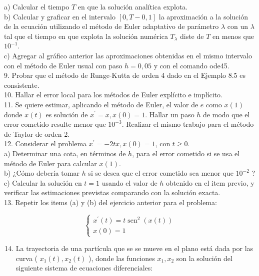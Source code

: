 \documentclass[10pt]{article}
\begin{document}
a) Calcular el tiempo $T$ en que la solución analítica explota.\\
b) Calcular y graficar en el intervalo $[0, T-0,1]$ la aproximación a la solución de la ecuación utilizando el método de Euler adaptativo de parámetro $\lambda$ con un $\lambda$ tal que el tiempo en que explota la solución numérica $T_{\lambda}$ diste de $T$ en menos que $10^{-1}$.\\
c) Agregar al gráfico anterior las aproximaciones obtenidas en el mismo intervalo con el método de Euler usual con paso $h=0,05$ y con el comando ode45.\\
9. Probar que el método de Runge-Kutta de orden 4 dado en el Ejemplo 8.5 es consistente.\\
10. Hallar el error local para los métodos de Euler explícito e implícito.\\
11. Se quiere estimar, aplicando el método de Euler, el valor de $e$ como $x(1)$ donde $x(t)$ es solución de $x^{\prime}=x, x(0)=1$. Hallar un paso $h$ de modo que el error cometido resulte menor que $10^{-3}$. Realizar el mismo trabajo para el método de Taylor de orden 2.\\
12. Considerar el problema $x^{\prime}=-2 t x, x(0)=1$, con $t \geq 0$.\\
a) Determinar una cota, en términos de $h$, para el error cometido si se usa el método de Euler para calcular $x(1)$.\\
b) ¿Cómo debería tomar $h$ si se desea que el error cometido sea menor que $10^{-2}$ ?\\
c) Calcular la solución en $t=1$ usando el valor de $h$ obtenido en el item previo, y verificar las estimaciones previstas comparando con la solución exacta.\\
13. Repetir los items (a) y (b) del ejercicio anterior para el problema:

$$
\left\{\begin{array}{l}
x^{\prime}(t)=t \operatorname{sen}^{2}(x(t)) \\
x(0)=1
\end{array}\right.
$$

\begin{enumerate}
  \setcounter{enumi}{13}
  \item La trayectoria de una partícula que se se mueve en el plano está dada por las curva ( $x_{1}(t), x_{2}(t)$ ), donde las funciones $x_{1}, x_{2}$ son la solución del siguiente sistema de ecuaciones diferenciales:
\end{enumerate}
\end{document}
